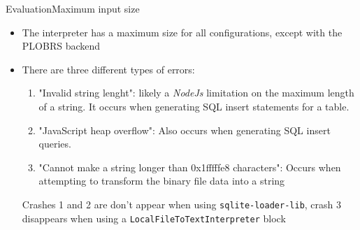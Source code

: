 \begin{frame}[t]{Evaluation}{Maximum input size}
	\begin{itemize}
		\item The interpreter has a maximum size for all configurations, except with the PLOBRS backend
		\item There are three different types of errors:
		      \begin{enumerate}
			      \item "Invalid string lenght": likely a \emph{NodeJs} limitation on the maximum length of a string. It occurs when generating SQL insert statements for a table.
			      \item "JavaScript heap overflow": Also occurs when generating SQL insert queries.
			      \item "Cannot make a string longer than 0x1fffffe8 characters": Occurs when attempting to transform the binary file data into a string
		      \end{enumerate}
		      Crashes 1 and 2 are don't appear when using \Verb|sqlite-loader-lib|, crash 3 disappears when using a \Verb|LocalFileToTextInterpreter| block
	\end{itemize}
	\begin{figure}
		\centering
	\end{figure}
\end{frame}

